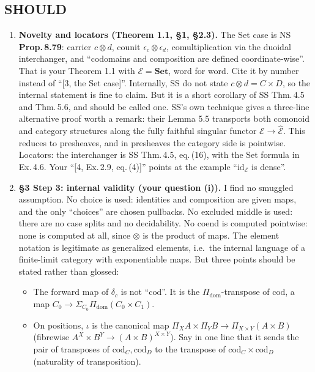 \documentclass[11pt]{article}
\newcommand{\Set}{\mathbf{Set}}
\newcommand{\E}{\mathcal{E}}
\begin{document}
\subsection*{SHOULD}
\begin{enumerate}[label=\textbf{S\arabic*.},leftmargin=*]
\item \textbf{Novelty and locators (Theorem 1.1, \S1, \S2.3).} The Set case is NS
  \textbf{Prop.\,8.79}: carrier $c\otimes d$, counit $\epsilon_c\otimes\epsilon_d$,
  comultiplication via the duoidal interchanger, and ``codomains and composition are defined
  coordinate-wise''. That is your Theorem 1.1 with $\E=\Set$, word for word. Cite it by number
  instead of ``[3, the Set case]''. Internally, SS do not state $c\otimes d=C\times D$, so the
  internal statement is fine to claim. But it is a short corollary of SS Thm.\,4.5 and Thm.\,5.6, and
  should be called one. SS's own technique gives a three-line alternative proof worth a remark:
  their Lemma 5.5 transports both comonoid and category structures along the fully faithful
  singular functor $\E\to\widehat{\E}$. This reduces to presheaves, and in presheaves the category
  side is pointwise. Locators: the interchanger is SS Thm.\,4.5, eq.\,(16), with the Set formula in
  Ex.\,4.6. Your ``[4, Ex.\,2.9, eq.\,(4)]'' points at the example ``$\mathrm{id}_\E$ is dense''.
\item \textbf{\S3 Step 3: internal validity (your question (i)).} I find no smuggled
  assumption. No choice is used: identities and composition are given maps, and the only ``choices''
  are chosen pullbacks. No excluded middle is used: there are no case splits and no decidability.
  No coend is computed pointwise: none is computed at all, since $\otimes$ is the product of maps.
  The element notation is legitimate as generalized elements, i.e.\ the internal language of a
  finite-limit category with exponentiable maps. But three points should be stated rather than
  glossed:
  \begin{itemize}[leftmargin=*]
  \item The forward map of $\delta_c$ is not ``$\mathrm{cod}$''. It is the
    $\Pi_{\mathrm{dom}}$-transpose of $\mathrm{cod}$, a map $C_0\to\Sigma_{C_0}\Pi_{\mathrm{dom}}(C_0\times C_1)$.
  \item On positions, $\iota$ is the canonical map
    $\Pi_X A\times\Pi_Y B\to\Pi_{X\times Y}(A\times B)$ (fibrewise $A^X\times B^Y\to(A\times B)^{X\times Y}$).
    Say in one line that it sends the pair of transposes of $\mathrm{cod}_C,\mathrm{cod}_D$ to the
    transpose of $\mathrm{cod}_C\times\mathrm{cod}_D$ (naturality of transposition).

\end{itemize}
\end{enumerate}
\end{document}
